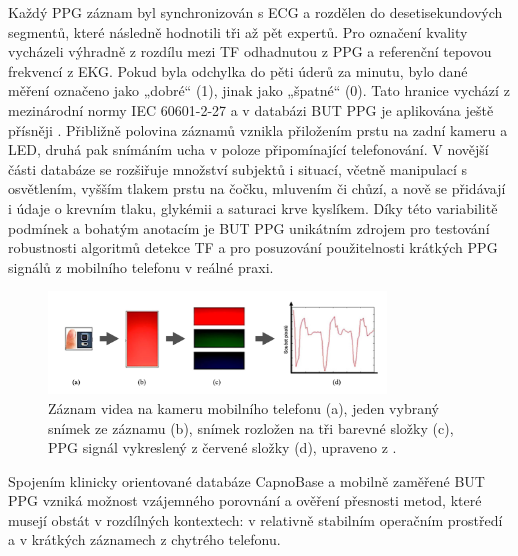 Každý \acs{PPG} záznam byl synchronizován s ECG a rozdělen do desetisekundových segmentů, které následně hodnotili tři až pět expertů.
Pro označení kvality vycházeli výhradně z rozdílu mezi \acs{TF} odhadnutou z \acs{PPG} a referenční tepovou frekvencí z EKG.
Pokud byla odchylka do pěti úderů za minutu, bylo dané měření označeno jako „dobré“ (1), jinak jako „špatné“ (0).
Tato hranice vychází z mezinárodní normy IEC 60601-2-27 a v databázi \acs{BUT PPG} je aplikována ještě přísněji \cite{BUT_PPG}.
Přibližně polovina záznamů vznikla přiložením prstu na zadní kameru a LED, druhá pak snímáním ucha v poloze připomínající telefonování.
V novější části databáze se rozšiřuje množství subjektů i situací, včetně manipulací s osvětlením, vyšším tlakem prstu na čočku, mluvením či chůzí, a nově se přidávají i údaje o krevním tlaku, glykémii a saturaci krve kyslíkem.
Díky této variabilitě podmínek a bohatým anotacím je \acs{BUT PPG} unikátním zdrojem pro testování robustnosti algoritmů detekce \acs{TF} a pro posuzování použitelnosti krátkých PPG signálů z mobilního telefonu v reálné praxi.

\begin{figure}[ht]
	\centering
	\includegraphics[width=0.8\textwidth]{./obrazky/videoZaznamPPG.png}
	\caption[Získání PPG signálu pro databázi \acs{BUT PPG}]{Záznam videa na kameru mobilního telefonu (a), jeden vybraný snímek ze záznamu (b), snímek rozložen na tři barevné složky (c), PPG signál vykreslený z červené složky (d), upraveno z \cite{Siddiqui2016}.}
	\label{fig:videoZaznamPPG}
\end{figure}

Spojením klinicky orientované databáze CapnoBase a mobilně zaměřené \acs{BUT PPG} vzniká možnost vzájemného porovnání a ověření přesnosti metod, které musejí obstát v rozdílných kontextech: v relativně stabilním operačním prostředí a v krátkých záznamech z chytrého telefonu.